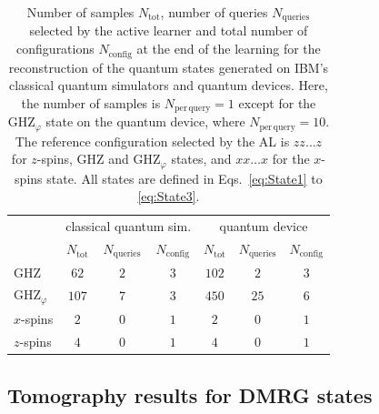 \documentclass[pra,aps,showpacs,groupedaddress,superscriptaddress,twocolumn,toc=flat,biblatex,footinbib]{revtex4-1}
\begin{document}
\begin{table}[]
\begin{tabular}{l|ccc|ccc}
           & \multicolumn{3}{c|}{classical quantum sim.} & \multicolumn{3}{c}{quantum device} \\
           & $N_{\mathrm{tot}}$ & $N_{\mathrm{queries}}$         & $N_{\mathrm{config}}$      & $N_{\mathrm{tot}}$     & $N_{\mathrm{queries}}$   & $N_{\mathrm{config}}$       \\\hline
GHZ        &    $62$            &    $2$               &     $3$    &    $102$          &   $2$  &     $3$                 \\
$\mathrm{GHZ}_{\varphi}$        &    $107$            &    $7$               &     $3$    &    $450$          &   $25$  &     $6$                 \\
$x$-spins &    $2$            &   $0$                   &     $1$ &     $2$         &   $0$           &     $1$        \\
$z$-spins   &   $4$             &     $0$ &     $1$                &        $4$      &    $0$   &     $1$              
\end{tabular}
\caption{Number of samples $N_{\mathrm{tot}}$, number of queries $N_{\mathrm{queries}}$ selected by the active learner and total number of configurations $N_{\mathrm{config}}$ at the end of the learning for the reconstruction of the quantum states generated on IBM's classical quantum simulators and quantum devices. Here, the number of samples is $N_{\mathrm{per\,query}}=1$ except for the $\mathrm{GHZ}_{\varphi}$ state on the quantum device, where $N_{\mathrm{per\,query}}=10$. The reference configuration selected by the AL is $zz\dots z$ for $z$-spins, GHZ and $\mathrm{GHZ}_{\varphi}$ states, and $xx\dots x$ for the $x$-spins state. All states are defined in Eqs.~\eqref{eq:State1} to \eqref{eq:State3}.}
\label{tab:Samples_IBM}
\end{table}


\subsection{Tomography results for DMRG states}
\end{document}
